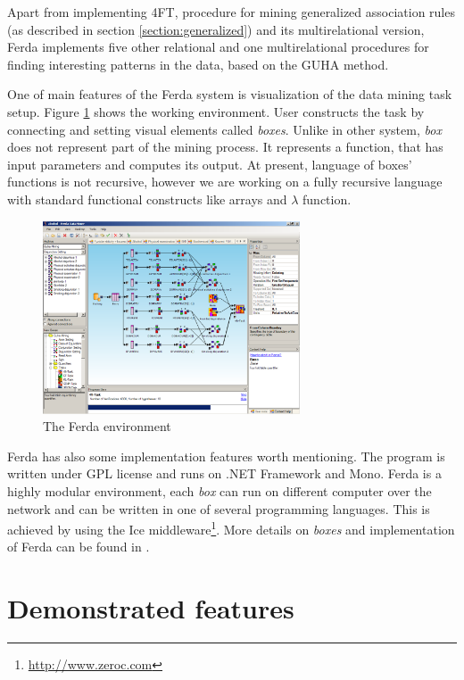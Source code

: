 \documentclass[conference]{IEEEtran}
\begin{document}
Apart from implementing 4FT, procedure for mining generalized association
rules (as described in section \ref{section:generalized}) and its multirelational 
version, Ferda implements five other relational and one multirelational 
procedures for finding interesting patterns in the data, based on the GUHA 
method. 

One of main features of the Ferda system is visualization of the data mining task
setup. Figure \ref{fig:environment} shows the working environment. User constructs
the task by connecting and setting visual elements called \emph{boxes}. Unlike in
other system, \emph{box} does not represent part of the mining process. It represents
a function, that has input parameters and computes its output. At present, language
of boxes' functions is not recursive, however we are working on a fully recursive
language with standard functional constructs like arrays and $\lambda$ function. 

\begin{figure}[!t]
\centering
\includegraphics[width=3in]{ferda.eps}
\caption{The Ferda environment}
\label{fig:environment}
\end{figure}

Ferda has also some implementation features worth mentioning. The program is written
under GPL license and runs on .NET Framework and Mono. Ferda is a highly modular 
environment, each \emph{box} can run on different computer over the network and can
be written in one of several programming languages. This is achieved by using the Ice
middleware\footnote{\url{http://www.zeroc.com}}. More details on \emph{boxes} 
and implementation of Ferda can be found in \cite{Ferda}.

\section{Demonstrated features}
\label{section:features}
\end{document}
